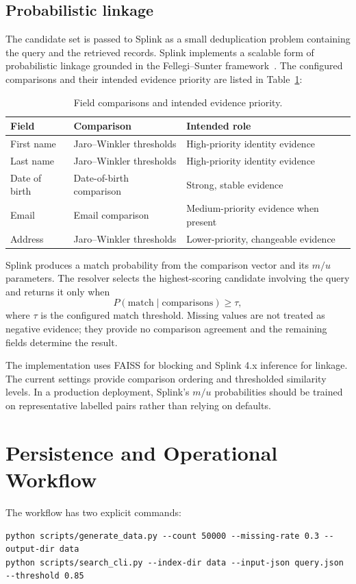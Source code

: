 \documentclass[conference]{IEEEtran}
\begin{document}
\subsection{Probabilistic linkage}
The candidate set is passed to Splink as a small deduplication problem containing the query and the retrieved records. Splink implements a scalable form of probabilistic linkage grounded in the Fellegi--Sunter framework~\cite{fellegi1969,linacre2022}. The configured comparisons and their intended evidence priority are listed in Table~\ref{tab:evidence-priority}:
\begin{table}[t]
\centering
\caption{Field comparisons and intended evidence priority.}
\label{tab:evidence-priority}
\begin{tabular}{lll}
\toprule
Field & Comparison & Intended role \\
\midrule
First name & Jaro--Winkler thresholds & High-priority identity evidence \\
Last name & Jaro--Winkler thresholds & High-priority identity evidence \\
Date of birth & Date-of-birth comparison & Strong, stable evidence \\
Email & Email comparison & Medium-priority evidence when present \\
Address & Jaro--Winkler thresholds & Lower-priority, changeable evidence \\
\bottomrule
\end{tabular}
\end{table}

Splink produces a match probability from the comparison vector and its $m/u$ parameters. The resolver selects the highest-scoring candidate involving the query and returns it only when
\[
 P(\mathrm{match}\mid\text{comparisons}) \geq \tau,
\]
where $\tau$ is the configured match threshold. Missing values are not treated as negative evidence; they provide no comparison agreement and the remaining fields determine the result.

The implementation uses FAISS for blocking and Splink 4.x inference for linkage. The current settings provide comparison ordering and thresholded similarity levels. In a production deployment, Splink's $m/u$ probabilities should be trained on representative labelled pairs rather than relying on defaults.

\section{Persistence and Operational Workflow}
The workflow has two explicit commands:
\begin{lstlisting}
python scripts/generate_data.py --count 50000 --missing-rate 0.3 --output-dir data
python scripts/search_cli.py --index-dir data --input-json query.json --threshold 0.85
\end{lstlisting}
\end{document}
